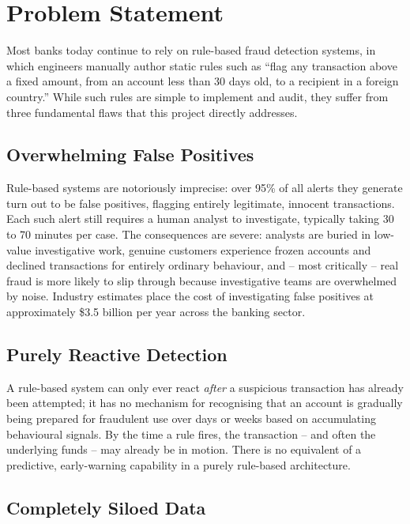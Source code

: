 \chapter{Problem Statement}

Most banks today continue to rely on rule-based fraud detection systems, in which engineers manually author static rules such as ``flag any transaction above a fixed amount, from an account less than 30 days old, to a recipient in a foreign country.'' While such rules are simple to implement and audit, they suffer from three fundamental flaws that this project directly addresses.

\section{Overwhelming False Positives}

Rule-based systems are notoriously imprecise: over 95\% of all alerts they generate turn out to be false positives, flagging entirely legitimate, innocent transactions. Each such alert still requires a human analyst to investigate, typically taking 30 to 70 minutes per case. The consequences are severe: analysts are buried in low-value investigative work, genuine customers experience frozen accounts and declined transactions for entirely ordinary behaviour, and -- most critically -- real fraud is more likely to slip through because investigative teams are overwhelmed by noise. Industry estimates place the cost of investigating false positives at approximately \$3.5 billion per year across the banking sector.

\section{Purely Reactive Detection}

A rule-based system can only ever react \textit{after} a suspicious transaction has already been attempted; it has no mechanism for recognising that an account is gradually being prepared for fraudulent use over days or weeks based on accumulating behavioural signals. By the time a rule fires, the transaction -- and often the underlying funds -- may already be in motion. There is no equivalent of a predictive, early-warning capability in a purely rule-based architecture.

\section{Completely Siloed Data}

